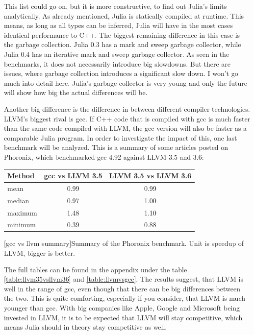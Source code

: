 This list could go on, but it is more constructive, to find out Julia's limits analytically.
As already mentioned, Julia is statically compiled at runtime. This means, as long as all types can be inferred, Julia will have in the most cases identical performance to C++.
The biggest remaining difference in this case is the garbage collection. Julia 0.3 has a mark and sweep garbage collector, while Julia 0.4 has an iterative mark and sweep garbage collector.
As seen in the benchmarks, it does not necessarily introduce big slowdowns. 
But there are issues, where garbage collection introduces a significant slow down\cite{ReadDlmGC}.
I won't go much into detail here. Julia's garbage collector is very young and only the future will show how big the actual differences will be.

Another big difference is the difference in between different compiler technologies.
\ac{LLVM}'s biggest rival is \ac{gcc}. If C++ code that is compiled with \ac{gcc} is much faster than the same code compiled with \ac{LLVM}, the \ac{gcc} version will also be faster as a comparable Julia program.
In order to investigate the impact of this, one last benchmark will be analyzed.
This is a summary of some articles posted on Phoronix, which benchmarked \ac{gcc} 4.92 against \ac{LLVM} 3.5 and 3.6:
\begin{table}[ht]
  \centering
  \begin{tabular}{l|c|c}
    \hline
    \textbf{Method} & \textbf{\ac{gcc} vs \ac{LLVM} 3.5} & \textbf{\ac{LLVM} 3.5 vs \ac{LLVM} 3.6} \\
    \hline
    mean & 0.99 & 0.99 \\
    median & 0.97 & 1.00 \\
    maximum & 1.48 & 1.10 \\
    minimum & 0.39 & 0.88 \\
    \hline
  \end{tabular}
    [gcc vs llvm summary]{Summary of the Phoronix benchmark. Unit is speedup of LLVM, bigger is better. \cite{LLVM35vsLLVM36}\cite{LLVMvsGCC}\cite{Phoronix}}
    \label{table:gccvsllvm}
\end{table}

The full tables can be found in the appendix under the table \ref{table:llvm35vsllvm36} and \ref{table:llvmvsgcc}.
The results suggest, that \ac{LLVM} is well in the range of \ac{gcc}, even though that there can be big differences between the two.
This is quite comforting, especially if you consider, that LLVM is much younger than gcc. 
With big companies like Apple, Google\cite{GoogleAppleLLVM} and Microsoft\cite{MicrosoftLLVM} being invested in LLVM, it is to be expected that \ac{LLVM} will stay competitive, which means Julia should in theory stay competitive as well.


